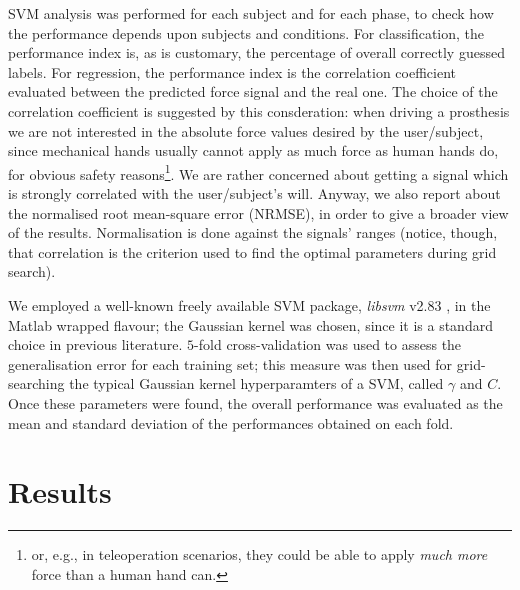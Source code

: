 \documentclass[10pt]{bmc_article}
\def\texttt{[image: ]}
\newenvironment{bmcformat}{\begin{raggedright}\baselineskip20pt\sloppy\setboolean{publ}{false}}{\end{raggedright}\baselineskip20pt\sloppy}
\begin{document}
\begin{bmcformat}
SVM analysis was performed for each subject and for each phase,
to check how the performance depends upon subjects and conditions.
For classification, the performance index is, as is
customary, the percentage of overall correctly guessed labels. For
regression, the performance index is the correlation coefficient
evaluated between the predicted force signal and the real one. The choice
of the correlation coefficient is suggested by this consderation:
when driving a prosthesis we are
not interested in the absolute force values desired by the
user/subject, since mechanical hands usually cannot apply as much
force as human hands do, for obvious safety reasons\footnote{or, e.g.,
in teleoperation scenarios, they could be able to apply \emph{much
more} force than a human hand can.}. We are rather concerned about
getting a signal which is strongly correlated with the user/subject's will.
Anyway, we also report about the normalised root mean-square error (NRMSE),
in order to give a broader view of the results. Normalisation is done against the
signals' ranges (notice, though, that correlation is the criterion used to
find the optimal parameters during grid search).

We employed a well-known freely available SVM package, \emph{libsvm}
v2.83 \cite{ChangL01}, in the Matlab wrapped flavour; the Gaussian kernel
was chosen, since it is a standard choice in previous literature.
$5$-fold cross-validation was
used to assess the generalisation error for each training set; this measure
was then used for grid-searching the typical Gaussian kernel hyperparamters
of a SVM, called $\gamma$ and $C$. Once these parameters were found, the overall
performance was evaluated as the mean and standard deviation of the performances
obtained on each fold.



\section*{Results}
\label{sec:exp}


\end{bmcformat}
\end{document}

